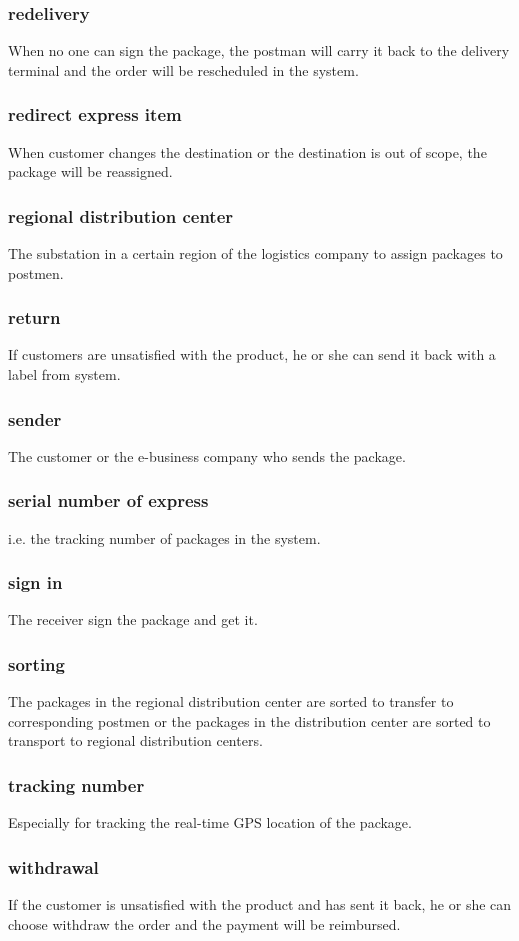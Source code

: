 \documentclass[12pt]{scrreprt}
\begin{document}
\begin{spacing}{0.7}
\subsubsection{redelivery}
When no one can sign the package, the postman will carry it back to the delivery terminal and the order will be rescheduled in the system.
\subsubsection{redirect express item}
When customer changes the destination or the destination is out of scope, the package will be reassigned.
\subsubsection{regional distribution center}
The substation in a certain region of the logistics company to assign packages to postmen.
\subsubsection{return}
If customers are unsatisfied with the product, he or she can send it back
with a label from system.
\subsubsection{sender}
The customer or the e-business company who sends the package.
\subsubsection{serial number of express}
i.e. the tracking number of packages in the system.
\subsubsection{sign in}
The receiver sign the package and get it.
\subsubsection{sorting}
The packages in the regional distribution center are sorted to transfer to corresponding postmen or the packages in the distribution center are sorted to transport to regional distribution centers.
\subsubsection{tracking number}
Especially for tracking the real-time GPS location of the package.
\subsubsection{withdrawal}
If the customer is unsatisfied with the product and has sent it back, he or she can choose withdraw the order and the payment will be reimbursed.
\end{spacing}
\end{document}
